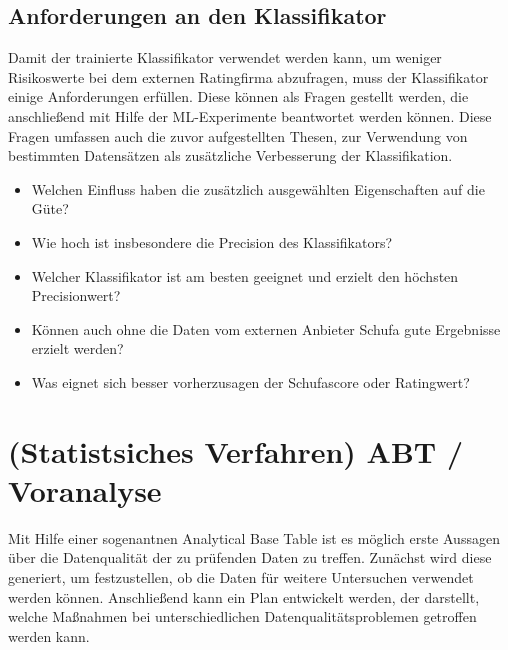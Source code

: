 \subsection{Anforderungen an den Klassifikator}
Damit der trainierte Klassifikator verwendet werden kann, um weniger Risikoswerte bei dem externen Ratingfirma abzufragen, muss der Klassifikator einige Anforderungen erfüllen.
Diese können als Fragen gestellt werden, die anschließend mit Hilfe der ML-Experimente beantwortet werden können. 
Diese Fragen umfassen auch die zuvor aufgestellten Thesen, zur Verwendung von bestimmten Datensätzen als zusätzliche Verbesserung der Klassifikation. 

\begin{itemize}
 \item Welchen Einfluss haben die zusätzlich ausgewählten Eigenschaften auf die Güte?
 \item Wie hoch ist insbesondere die Precision des Klassifikators?
 \item Welcher Klassifikator ist am besten geeignet und erzielt den höchsten Precisionwert?
 \item Können auch ohne die Daten vom externen Anbieter Schufa gute Ergebnisse erzielt werden?
 \item Was eignet sich besser vorherzusagen der Schufascore oder Ratingwert?
\end{itemize}



\section{(Statistsiches Verfahren) ABT / Voranalyse}
Mit Hilfe einer sogenantnen Analytical Base Table ist es möglich erste Aussagen über die Datenqualität der zu prüfenden Daten zu treffen.
Zunächst wird diese generiert, um festzustellen, ob die Daten für weitere Untersuchen verwendet werden können.
Anschließend kann ein Plan entwickelt werden, der darstellt, welche Maßnahmen bei unterschiedlichen Datenqualitätsproblemen getroffen werden kann.






